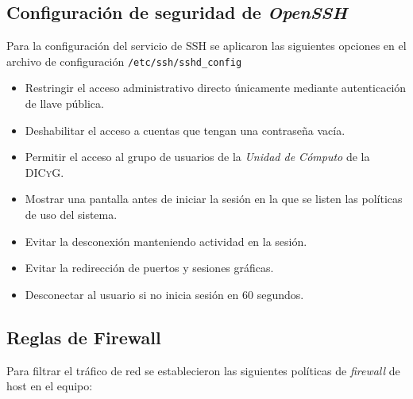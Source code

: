       \subsection {Configuraci\'{o}n de seguridad de \textsl{OpenSSH}}

Para la configuraci\'{o}n del servicio de \textsc{SSH} se aplicaron las siguientes opciones en el archivo de configuraci\'{o}n \texttt{/etc/ssh/sshd\_config}

\begin{itemize}
  \item Restringir el acceso administrativo directo \'{u}nicamente mediante autenticaci\'{o}n de llave p\'{u}blica.
  \item Deshabilitar el acceso a cuentas que tengan una contrase\~{n}a vac\'{i}a.
  \item Permitir el acceso al grupo de usuarios de la \textit{Unidad de C\'{o}mputo} de la \textsc{DICyG}.
  \item  Mostrar una pantalla antes de iniciar la sesi\'{o}n en la que se listen las pol\'{i}ticas de uso del sistema.
  \item Evitar la desconexi\'{o}n manteniendo actividad en la sesi\'{o}n.
  \item Evitar la redirecci\'{o}n de puertos y sesiones gr\'{a}ficas.
  \item Desconectar al usuario si no inicia sesi\'{o}n en 60 segundos.
\end{itemize}

      \subsection {Reglas de Firewall}
      \label{subsec:fw-rules}

Para filtrar el tr\'{a}fico de red se establecieron las siguientes pol\'{i}ticas de \textit{firewall} de host en el equipo:

